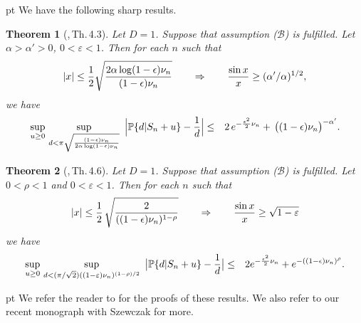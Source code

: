 \documentclass[11pt,draft,reqno]{amsart}
\newtheorem{theorem}{Theorem}[section]
\theoremstyle{definition}
\theoremstyle{remarks}
\numberwithin{equation}{section}
\def \a{{\alpha}}
\def \e{{\varepsilon}}
\def \p{{\varphi}}
\def \qq{{\qquad}}
\def\P{{\mathcal P}}
\def\P{{\mathbb P}}
\begin{document}
    pt We have the following sharp results.
 \begin{theorem}[\cite{W10},\,Th.\,4.3]\label{saud1} Let $D=1$. Suppose that assumption ($\mathcal B$) is fulfilled.   Let $\a\!>\!\a'\!>\!0$, $0\!<\!\e\!<\!1$. Then for   each $n$ such that 
$$|x|\le\frac12 \sqrt{  \frac{ 2\a\log (1-\epsilon)\nu_n}{ (1-\epsilon)\nu_n }}\qq \Rightarrow \qq{\sin x\over
x}\ge (\a^\prime/\a)^{1/2},$$
   we have
 \begin{eqnarray*} \sup_{u\ge 0}\,\sup_{d<  \pi  \sqrt{   (1-\epsilon)\nu_n \over 2\a\log (1-\epsilon)\nu_n}} \ \Big| \P \{d|S_n+u  \}   -  {1\over d} \Big|
    &\le &2 \,e^{- \frac{\epsilon^2 }{2}\nu_n}+
 \,\big( (1-\epsilon)\nu_n\big)^{-\a'}  .
\end{eqnarray*}
\end{theorem}
   
 \begin{theorem}[\cite{W10},\,Th.\,4.6]\label{saud2} Let $D=1$. Suppose that assumption ($\mathcal B$) is fulfilled. Let $0<\rho<1 $ and   $0<\e<1$. Then for   each $n$ such that 
$$|x|\le\frac12 \,\sqrt{  \frac{ 2 }{ ((1-\epsilon)\nu_n)^{1-\rho} }}\qq \Rightarrow \qq{\sin x\over
x}\ge \sqrt{1-\e}$$
we have\begin{eqnarray*} 
\sup_{u\ge 0}\,\sup_{d<  (\pi/\sqrt 2) ((1-\e)\nu_n)^{(1-\rho)/2} }\ \big| \P \{d|S_n+u  \}   -  {1\over d} \big|  
   &\le  &  2 e^{- \frac{\epsilon^2 }{2}\nu_n}+e^{- ( (1-\epsilon)\nu_n)^\rho}
  .
\end{eqnarray*}
\end{theorem}
  pt We refer the reader to \cite{W10} for the proofs of these results.
 We also refer to our  recent monograph   with    Szewczak \cite{SW} for more.
 
 

 
\end{document}
